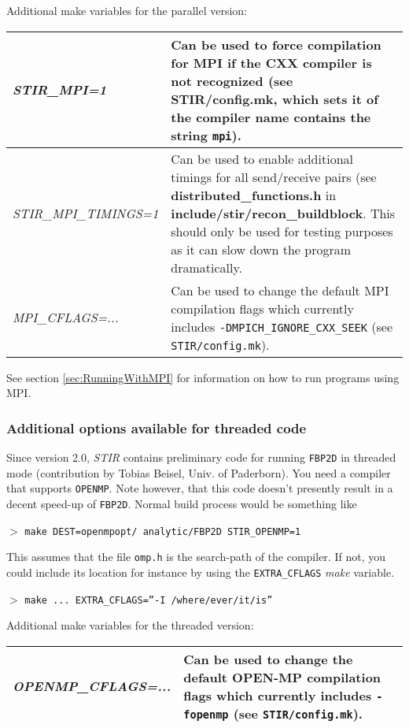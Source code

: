 \documentclass{article}
\newcommand{\cmdline}[1]{\par \noindent $>$ \texttt{#1}\par}
\begin{document}
Additional make variables for the parallel version:

\begin{longtable}{|p{\MakeTableFirstCol}|p{\MakeTableSecondCol}|}
\hline
{\raggedright \textit{STIR\_MPI=1}} & 
{\raggedright
Can be used to force compilation for MPI if the CXX compiler is not recognized (see 
\textbf{STIR/config.mk}, which sets it of the compiler name contains the string \texttt{mpi}).
} \\
\hline
{\raggedright \textit{STIR\_MPI\_TIMINGS=1}} & 
{\raggedright
Can be used to enable additional timings for all send/receive pairs 
(see \textbf{distributed\_functions.h} in \textbf{include/stir/recon\_buildblock}. 
This should only be used for testing purposes as it can slow down
the program dramatically.
} \\
\hline
{\raggedright
\textit{MPI\_CFLAGS=...}} & 
{\raggedright
Can be used to change the default MPI compilation flags which currently includes
\texttt{-DMPICH\_IGNORE\_CXX\_SEEK} (see 
\texttt{STIR/config.mk}).
} \\
\hline
\end{longtable}

See section \ref{sec:RunningWithMPI} for information on how to run programs using MPI.

\subsubsection{
Additional options available for threaded code}

Since version 2.0, \textit{STIR} contains preliminary code for running \texttt{FBP2D} in threaded mode
(contribution by Tobias Beisel, Univ. of Paderborn). You need a compiler that 
supports \texttt{OPENMP}. Note however, that this code doesn't presently result 
in a decent speed-up of \texttt{FBP2D}. Normal build process would be something like

\cmdline{make DEST=openmpopt/ analytic/FBP2D STIR\_OPENMP=1}

This assumes that the file \texttt{omp.h} is the search-path of the compiler. If not,
you could include its location for instance by using the \texttt{EXTRA\_CFLAGS} \textit{make} variable.

\cmdline{make ... EXTRA\_CFLAGS=''-I /where/ever/it/is''}


Additional make variables for the threaded version:

\begin{longtable}{|p{\MakeTableFirstCol}|p{\MakeTableSecondCol}|}
\hline

{\raggedright
\textit{OPENMP\_CFLAGS=...}} &
{\raggedright
Can be used to change the default OPEN-MP compilation flags which currently includes
\texttt{-fopenmp} (see 
\texttt{STIR/config.mk}).
} \\
\hline
\end{longtable}
\end{document}
